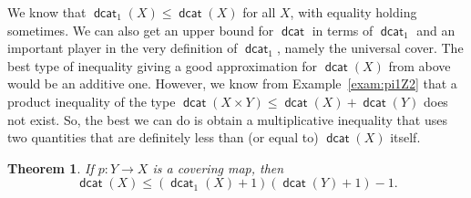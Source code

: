 \documentclass[amscd,amssymb,verbatim,11pt]{amsart}
\theoremstyle{plain}
\newtheorem{theorem}[thm]{Theorem}
\theoremstyle{definition}
\DeclareMathOperator{\dcat}{{\mathsf{dcat}}}
\begin{document}
We know that $\dcat_1(X) \leq \dcat(X)$ for all $X$, with equality holding sometimes. We can also get an upper bound for $\dcat$ in terms of $\dcat_1$ and an important player in the very definition of $\dcat_1$, namely the universal cover. The best type of inequality giving a good approximation for $\dcat(X)$ from above would be an additive one. However, we know from Example~\ref{exam:pi1Z2} that a product inequality of the type $\dcat(X \times Y) \leq \dcat(X) + 
\dcat(Y)$ does not exist. So, the best we can do is obtain a multiplicative inequality that uses two quantities that are definitely less than (or equal to) $\dcat(X)$ itself.

\begin{theorem}\label{thm:general ineq}
    If $p\colon Y\to X$ is a covering map, then
    \[
    \dcat(X)\le (\dcat_1(X)+1)(\dcat(Y)+1)-1.
    \]
\end{theorem}
\end{document}
